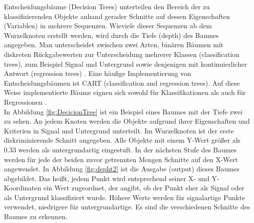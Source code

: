 Entscheidungsb\"aume (Decision Trees) unterteilen den Bereich der zu klassifizierenden Objekte anhand gerader Schnitte auf dessen Eigenschaften (Variablen) in mehrere Sequenzen. Wieviele dieser Sequenzen ab dem Wurzelknoten erstellt werden, wird durch die Tiefe (depth) des Baumes angegeben. Man unterscheidet zwischen zwei Arten, bin\"aren B\"aumen mit diskreten R\"uckgabewerten zur Unterscheidung mehrerer Klassen (classification trees), zum Beispiel Signal und Untergrund sowie denjenigen mit kontinuierlicher Antwort (regression trees) \cite{SWB-455193959}. Eine h\"aufige Implementierung von Entscheidungsb\"aumen ist CART (classification and regression trees). Auf diese Weise implementierte B\"aume eignen sich sowohl f\"ur Klassifikationen als auch f\"ur Regressionen \cite{CART}.\\
In Abbildung \ref{fig:DecicionTree} ist ein Beispiel eines Baumes mit der Tiefe zwei zu sehen. An jedem Knoten werden die Objekte aufgrund ihrer Eigenschaften und Kriterien in Signal und Untergrund unterteilt. Im Wurzelknoten ist der erste diskriminierende Schnitt angegeben. Alle Objekte mit einem Y-Wert gr\"o\ss er als 0.33 werden als untergrundartig eingestuft. In der n\"achsten Stufe des Baumes werden f\"ur jede der beiden zuvor getrennten Mengen Schnitte auf den X-Wert angewendet. In Abbildung \ref{fig:depht2} ist die Ausgabe (output) dieses Baumes abgebildet. Das hei\ss t, jedem Punkt wird entsprechend seiner X- und Y-Koordinaten ein Wert zugeordnet, der angibt, ob der Punkt eher als Signal oder als Untergrund klassifiziert wurde. H\"ohere Werte werden f\"ur signalartige Punkte verwendet, niedrigere f\"ur untergrundartige. Es sind die verschiedenen Schnitte des Baumes zu erkennen.\\

